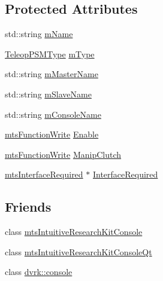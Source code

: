 \subsection*{Protected Attributes}
\begin{DoxyCompactItemize}
\item 
std\-::string \hyperlink{classmts_intuitive_research_kit_console_1_1_teleop_p_s_m_af5dcbe74f35596d832f9bb659b78c84d}{m\-Name}
\item 
\hyperlink{classmts_intuitive_research_kit_console_1_1_teleop_p_s_m_a977dd6507042ababf692f478cdf513cc}{Teleop\-P\-S\-M\-Type} \hyperlink{classmts_intuitive_research_kit_console_1_1_teleop_p_s_m_aeca82c7ef619e84ffcdacca808264cdb}{m\-Type}
\item 
std\-::string \hyperlink{classmts_intuitive_research_kit_console_1_1_teleop_p_s_m_ad3b27017bde0642db497ead56cb0e0b5}{m\-Master\-Name}
\item 
std\-::string \hyperlink{classmts_intuitive_research_kit_console_1_1_teleop_p_s_m_a4b8eb2520e536cf70180630b5a725fea}{m\-Slave\-Name}
\item 
std\-::string \hyperlink{classmts_intuitive_research_kit_console_1_1_teleop_p_s_m_a61f2ab6fcd13ffd09bb20d48d6b71478}{m\-Console\-Name}
\item 
\hyperlink{classmts_function_write}{mts\-Function\-Write} \hyperlink{classmts_intuitive_research_kit_console_1_1_teleop_p_s_m_a4c6f4a4401b105316496f9c4647fc92a}{Enable}
\item 
\hyperlink{classmts_function_write}{mts\-Function\-Write} \hyperlink{classmts_intuitive_research_kit_console_1_1_teleop_p_s_m_aecf1d8b36536c65868594b353a667d57}{Manip\-Clutch}
\item 
\hyperlink{classmts_interface_required}{mts\-Interface\-Required} $\ast$ \hyperlink{classmts_intuitive_research_kit_console_1_1_teleop_p_s_m_ab8c82b1d92616b726cdffc634c336feb}{Interface\-Required}
\end{DoxyCompactItemize}
\subsection*{Friends}
\begin{DoxyCompactItemize}
\item 
class \hyperlink{classmts_intuitive_research_kit_console_1_1_teleop_p_s_m_a6e35490bedd0064dfeec97d358594b90}{mts\-Intuitive\-Research\-Kit\-Console}
\item 
class \hyperlink{classmts_intuitive_research_kit_console_1_1_teleop_p_s_m_a9cbd14ff7aa15c6b787a1640dd0a598b}{mts\-Intuitive\-Research\-Kit\-Console\-Qt}
\item 
class \hyperlink{classmts_intuitive_research_kit_console_1_1_teleop_p_s_m_a30eecdaed2d925aff1a8ca2341429a2d}{dvrk\-::console}
\end{DoxyCompactItemize}


